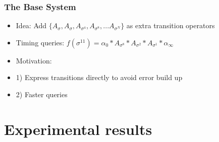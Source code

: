\documentclass{beamer}
\begin{document}
\begin{frame}
\frametitle{The Base System}
\begin{itemize}

\item Idea: Add $\{A_{\sigma}, A_{\sigma}, A_{\sigma^4}, A_{\sigma^8}, ... A_{\sigma^N}\}$ as extra transition operators

\item Timing queries: $f(\sigma^{11}) = \alpha_0*A_{\sigma^8}*A_{\sigma^2}*A_{\sigma^1}*\alpha_\infty$

\item Motivation: 
\item[] 1) Express transitions directly to avoid error build up
\item[] 2) Faster queries
\end{itemize}
\end{frame}

\section{Experimental results}
\end{document}
